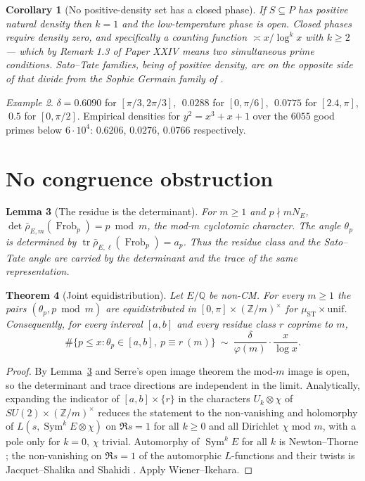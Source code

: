 \documentclass[11pt]{amsart}
\numberwithin{equation}{section}
\newtheorem{theorem}{Theorem}[section]
\newtheorem{lemma}[theorem]{Lemma}
\newtheorem{corollary}[theorem]{Corollary}
\theoremstyle{definition}
\theoremstyle{remark}
\newtheorem{example}[theorem]{Example}
\newcommand{\Z}{\mathbb{Z}}
\newcommand{\Q}{\mathbb{Q}}
\newcommand{\Sym}{\operatorname{Sym}}
\newcommand{\Tr}{\operatorname{tr}}
\newcommand{\Frob}{\operatorname{Frob}}
\newcommand{\ST}{\mathrm{ST}}
\begin{document}
\begin{corollary}[No positive-density set has a closed phase]\label{cor:noclosed}
If $S\subseteq P$ has positive natural density then $k=1$ and the low-temperature phase is
open. Closed phases require density zero, and specifically a counting function
$\asymp x/\log^kx$ with $k\ge2$ --- which by Remark 1.3 of Paper XXIV means two
simultaneous prime conditions. Sato--Tate families, being of positive density, are on the
opposite side of that divide from the Sophie Germain family of \cite[Thm.~5.5]{Main}.
\end{corollary}

\begin{example}\label{ex:densities}
$\delta=0.6090$ for $[\pi/3,2\pi/3]$, $\;0.0288$ for $[0,\pi/6]$, $\;0.0775$ for
$[2.4,\pi]$, $\;0.5$ for $[0,\pi/2]$. Empirical densities for $y^2=x^3+x+1$ over the
$6055$ good primes below $6\cdot10^4$: $0.6206$, $0.0276$, $0.0766$ respectively.
\end{example}

\section{No congruence obstruction}

\begin{lemma}[The residue is the determinant]\label{lem:det}
For $m\ge1$ and $p\nmid m N_E$, $\det\bar\rho_{E,m}(\Frob_p)=p\bmod m$, the mod-$m$
cyclotomic character. The angle $\theta_p$ is determined by
$\Tr\bar\rho_{E,\ell}(\Frob_p)=a_p$. Thus the residue class and the Sato--Tate angle are
carried by the determinant and the trace of the same representation.
\end{lemma}

\begin{theorem}[Joint equidistribution]\label{thm:joint}
Let $E/\Q$ be non-CM. For every $m\ge1$ the pairs $(\theta_p,p\bmod m)$ are equidistributed
in $[0,\pi]\times(\Z/m)^\times$ for $\mu_\ST\times\mathrm{unif}$. Consequently, for every
interval $[a,b]$ and every residue class $r$ coprime to $m$,
\[
\#\bigl\{p\le x:\theta_p\in[a,b],\ p\equiv r\ (m)\bigr\}\ \sim\ \frac{\delta}{\varphi(m)}\cdot\frac{x}{\log x}.
\]
\end{theorem}

\begin{proof}
By Lemma~\ref{lem:det} and Serre's open image theorem \cite{Serre} the mod-$m$ image is open, so the
determinant and trace directions are independent in the limit. Analytically, expanding the
indicator of $[a,b]\times\{r\}$ in the characters $U_k\otimes\chi$ of
$SU(2)\times(\Z/m)^\times$ reduces the statement to the non-vanishing and holomorphy of
$L(s,\Sym^kE\otimes\chi)$ on $\Re s=1$ for all $k\ge0$ and all Dirichlet $\chi$ mod $m$,
with a pole only for $k=0$, $\chi$ trivial. Automorphy of $\Sym^kE$ for all $k$ is
Newton--Thorne \cite{NT}; the non-vanishing on $\Re s=1$ of the automorphic $L$-functions and their
twists is Jacquet--Shalika \cite{JS} and Shahidi \cite{Shahidi}. Apply Wiener--Ikehara.
\end{proof}
\end{document}
